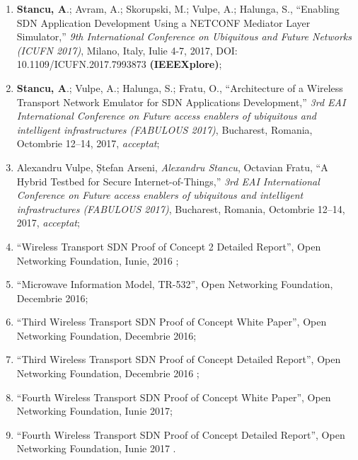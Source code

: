 \begin{enumerate}
	\item \textbf{Stancu, A}.; Avram, A.; Skorupski, M.; Vulpe, A.; Halunga, S., ``Enabling SDN Application Development Using a NETCONF Mediator Layer Simulator,'' \textit{9th International Conference on Ubiquitous and Future Networks (ICUFN 2017)}, Milano, Italy, Iulie 4-7, 2017, DOI: 10.1109/ICUFN.2017.7993873 \textbf{(IEEEXplore)}\label{item:dvm_v02};
	
	\item \textbf{Stancu, A}.; Vulpe, A.; Halunga, S.; Fratu, O., ``Architecture of a Wireless Transport Network Emulator for SDN Applications Development,'' \textit{3rd EAI International Conference on Future access enablers of ubiquitous and intelligent infrastructures (FABULOUS 2017)}, Bucharest, Romania, Octombrie 12–14, 2017, \textit{acceptat}\label{item:wte};
	
	\item Alexandru Vulpe, Ștefan Arseni, \textit{Alexandru Stancu}, Octavian Fratu, ``A Hybrid Testbed for Secure Internet-of-Things,'' \textit{3rd EAI International Conference on Future access enablers of ubiquitous and intelligent infrastructures (FABULOUS 2017)}, Bucharest, Romania, Octombrie 12–14, 2017, \textit{acceptat};
	
	\item ``Wireless Transport SDN Proof of Concept 2 Detailed Report'', Open Networking Foundation, Iunie, 2016 \label{item:poc_2};
	
	\item ``Microwave Information Model, TR-532'', Open Networking Foundation, Decembrie 2016;
	
	\item ``Third Wireless Transport SDN Proof of Concept White Paper'', Open Networking Foundation, Decembrie 2016;
	
	\item ``Third Wireless Transport SDN Proof of Concept Detailed Report'', Open Networking Foundation, Decembrie 2016 \label{item:poc_3};
	
	\item ``Fourth Wireless Transport SDN Proof of Concept White Paper'', Open Networking Foundation, Iunie 2017;
	
	\item ``Fourth Wireless Transport SDN Proof of Concept Detailed Report'', Open Networking Foundation, Iunie 2017 \label{item:poc_4}.
	
\end{enumerate}